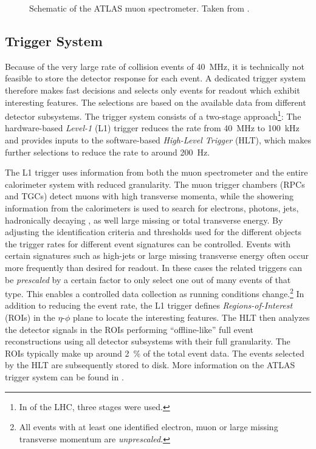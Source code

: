 

\begin{figure}
    \caption{Schematic of the ATLAS muon spectrometer. Taken from .}
    \label{fig:ATLASmuonspectrometer}
\end{figure}



\subsection{Trigger System}
Because of the very large rate of collision events of \SI{40}{\mega\hertz}, it is technically not feasible to store the detector response for each event.
A dedicated trigger system therefore makes fast decisions and selects only events for readout which exhibit interesting features.
The selections are based on the available data from different detector subsystems.
The \RunTwo trigger system consists of a two-stage approach\footnote{In \RunOne of the LHC, three stages were used.}:
The hardware-based \emph{Level-1} (L1) trigger reduces the rate from \SI{40}{\mega\hertz} to \SI{100}{\kilo\hertz} and provides inputs to the software-based \emph{High-Level Trigger} (HLT), which makes further selections to reduce the rate to around \SI{200}{\hertz}.

The L1 trigger uses information from both the muon spectrometer and the entire calorimeter system with reduced granularity.
The muon trigger chambers (RPCs and TGCs) detect muons with high transverse momenta, while the showering information from the calorimeters is used to search for electrons, photons, jets, hadronically decaying \tauleptons, as well large missing or total transverse energy.
By adjusting the identification criteria and thresholds used for the different objects the trigger rates for different event signatures can be controlled.
Events with certain signatures such as high-\pT jets or large missing transverse energy often occur more frequently than desired for readout. In these cases the related triggers can be \emph{prescaled} by a certain factor to only select one out of many events of that type. This enables a controlled data collection as running conditions change.\footnote{All events with at least one identified electron, muon or large missing transverse momentum are \emph{unprescaled}.}
In addition to reducing the event rate, the L1 trigger defines \emph{Regions-of-Interest} (ROIs) in the $\eta$-$\phi$ plane to locate the interesting features.
The HLT then analyzes the detector signals in the ROIs performing ``offline-like'' full event reconstructions using all detector subsystems with their full granularity. The ROIs typically make up around \SI{2}{\percent} of the total event data.
The events selected by the HLT are subsequently stored to disk.
More information on the ATLAS trigger system can be found in .

